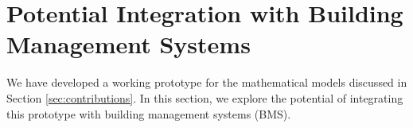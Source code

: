 


\section{Potential Integration with Building Management Systems}

We have developed a working prototype for the mathematical models discussed in Section \ref{sec:contributions}. In this section, we explore the potential of integrating this prototype with building management systems (BMS). 

